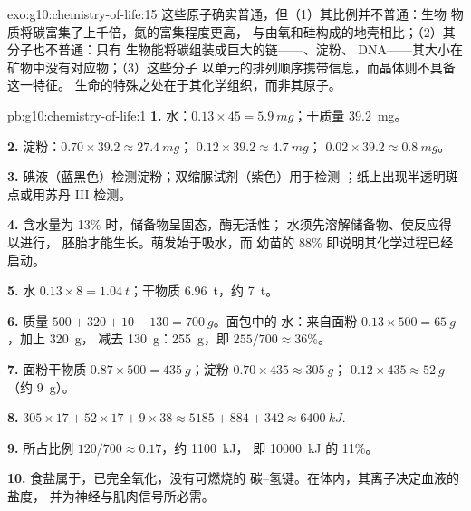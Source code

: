 \begin{solution}{exo:g10:chemistry-of-life:15}
这些原子确实普通，但（1）其比例并不普通：生物
物质将碳富集了上千倍，氮的富集程度更高，
与由氧和硅构成的地壳相比；（2）其分子也不普通：只有
生物能将碳组装成巨大的链——、淀粉、
DNA——其大小在矿物中没有对应物；（3）这些分子
以单元的排列顺序携带信息，而晶体则不具备这一特征。
生命的特殊之处在于其化学组织，而非其原子。
\end{solution}

\begin{solution}{pb:g10:chemistry-of-life:1}
\textbf{1.} 水：$0.13 \times 45 = \qty{5.9}{mg}$；干质量
\qty{39.2}{mg}。

\textbf{2.} 淀粉：$0.70 \times 39.2 \approx \qty{27.4}{mg}$；
$0.12 \times 39.2 \approx \qty{4.7}{mg}$； $0.02 \times 39.2
\approx \qty{0.8}{mg}$。

\textbf{3.} 碘液（蓝黑色）检测淀粉；双缩脲试剂（紫色）用于检测
；纸上出现半透明斑点或用苏丹 III 检测。

\textbf{4.} 含水量为 13\% 时，储备物呈固态，酶无活性；
水须先溶解储备物、使反应得以进行，
胚胎才能生长。萌发始于吸水，而
幼苗的 88\% 即说明其化学过程已经启动。

\textbf{5.} 水 $0.13 \times 8 = \qty{1.04}{t}$；干物质
\qty{6.96}{t}，约 \qty{7}{t}。

\textbf{6.} 质量 $500 + 320 + 10 - 130 = \qty{700}{g}$。面包中的
水：来自面粉 $0.13 \times 500 = \qty{65}{g}$，加上 \qty{320}{g}，
减去 \qty{130}{g}：\qty{255}{g}，即 $255/700 \approx 36\%$。

\textbf{7.} 面粉干物质 $0.87 \times 500 = \qty{435}{g}$；淀粉
$0.70 \times 435 \approx \qty{305}{g}$； $0.12 \times 435 \approx
\qty{52}{g}$（约 \qty{9}{g}）。

\textbf{8.} $305 \times 17 + 52 \times 17 + 9 \times 38 \approx 5185 +
884 + 342 \approx \qty{6400}{kJ}$.

\textbf{9.} 所占比例 $120/700 \approx 0.17$，约 \qty{1100}{kJ}，
即 \qty{10000}{kJ} 的 11\%。

\textbf{10.} 食盐属于，已完全氧化，没有可燃烧的
碳–氢键。在体内，其离子决定血液的盐度，
并为神经与肌肉信号所必需。


\end{solution}
